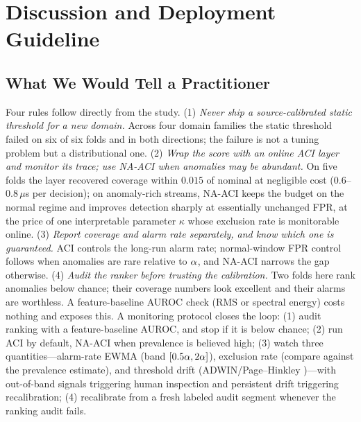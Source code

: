 \section{Discussion and Deployment Guideline}
\label{sec:discussion}

\subsection{What We Would Tell a Practitioner}
Four rules follow directly from the study. (1) \emph{Never ship a source-calibrated static threshold for a new domain.} Across four domain families the static threshold failed on six of six folds and in both directions; the failure is not a tuning problem but a distributional one. (2) \emph{Wrap the score with an online ACI layer and monitor its trace; use NA-ACI when anomalies may be abundant.} On five folds the layer recovered coverage within $0.015$ of nominal at negligible cost ($0.6$--$0.8\,\mu$s per decision); on anomaly-rich streams, NA-ACI keeps the budget on the normal regime and improves detection sharply at essentially unchanged FPR, at the price of one interpretable parameter $\kappa$ whose exclusion rate is monitorable online. (3) \emph{Report coverage and alarm rate separately, and know which one is guaranteed.} ACI controls the long-run alarm rate; normal-window FPR control follows when anomalies are rare relative to $\alpha$, and NA-ACI narrows the gap otherwise. (4) \emph{Audit the ranker before trusting the calibration.} Two folds here rank anomalies below chance; their coverage numbers look excellent and their alarms are worthless. A feature-baseline AUROC check (RMS or spectral energy) costs nothing and exposes this. A monitoring protocol closes the loop: (1) audit ranking with a feature-baseline AUROC, and stop if it is below chance; (2) run ACI by default, NA-ACI when prevalence is believed high; (3) watch three quantities---alarm-rate EWMA (band $[0.5\alpha,2\alpha]$), exclusion rate (compare against the prevalence estimate), and threshold drift (ADWIN/Page--Hinkley \cite{adwin2007,page1954})---with out-of-band signals triggering human inspection and persistent drift triggering recalibration; (4) recalibrate from a fresh labeled audit segment whenever the ranking audit fails.



